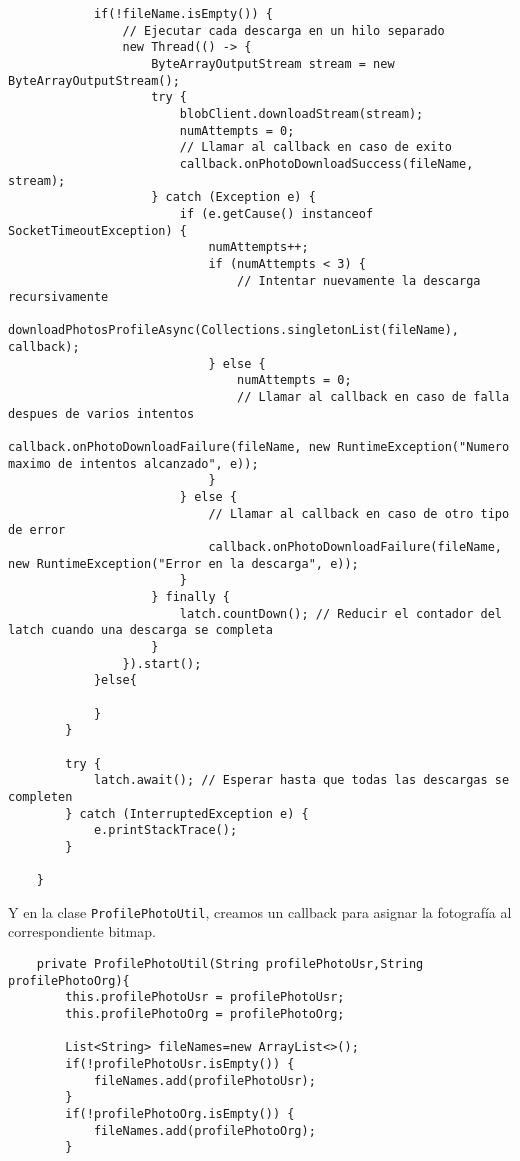 \begin{itemize}
\begin{lstlisting}
            if(!fileName.isEmpty()) {
                // Ejecutar cada descarga en un hilo separado
                new Thread(() -> {
                    ByteArrayOutputStream stream = new ByteArrayOutputStream();
                    try {
                        blobClient.downloadStream(stream);
                        numAttempts = 0;
                        // Llamar al callback en caso de exito
                        callback.onPhotoDownloadSuccess(fileName, stream);
                    } catch (Exception e) {
                        if (e.getCause() instanceof SocketTimeoutException) {
                            numAttempts++;
                            if (numAttempts < 3) {
                                // Intentar nuevamente la descarga recursivamente
                                downloadPhotosProfileAsync(Collections.singletonList(fileName), callback);
                            } else {
                                numAttempts = 0;
                                // Llamar al callback en caso de falla despues de varios intentos
                                callback.onPhotoDownloadFailure(fileName, new RuntimeException("Numero maximo de intentos alcanzado", e));
                            }
                        } else {
                            // Llamar al callback en caso de otro tipo de error
                            callback.onPhotoDownloadFailure(fileName, new RuntimeException("Error en la descarga", e));
                        }
                    } finally {
                        latch.countDown(); // Reducir el contador del latch cuando una descarga se completa
                    }
                }).start();
            }else{

            }
        }

        try {
            latch.await(); // Esperar hasta que todas las descargas se completen
        } catch (InterruptedException e) {
            e.printStackTrace();
        }

    }
    \end{lstlisting}
    Y en la clase \texttt{ProfilePhotoUtil}, creamos un callback para asignar la fotografía al correspondiente bitmap.
    \begin{lstlisting}
    private ProfilePhotoUtil(String profilePhotoUsr,String profilePhotoOrg){
        this.profilePhotoUsr = profilePhotoUsr;
        this.profilePhotoOrg = profilePhotoOrg;

        List<String> fileNames=new ArrayList<>();
        if(!profilePhotoUsr.isEmpty()) {
            fileNames.add(profilePhotoUsr);
        }
        if(!profilePhotoOrg.isEmpty()) {
            fileNames.add(profilePhotoOrg);
        }


\end{lstlisting}
\end{itemize}
